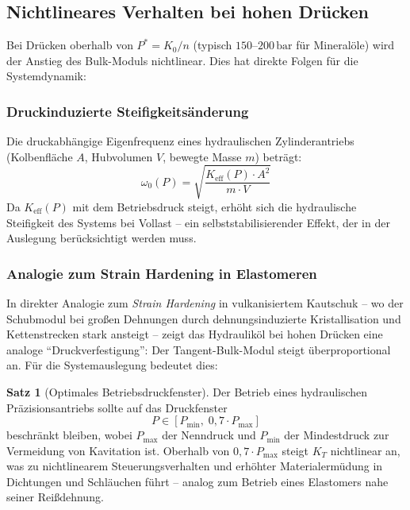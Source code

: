 ﻿\documentclass[a4paper,12pt]{scrreprt}
\theoremstyle{definition}
\newtheorem{satz}{Satz}[section]
\begin{document}
\subsection{Nichtlineares Verhalten bei hohen Drücken}

Bei Drücken oberhalb von $P^* = K_0 / n$ (typisch $150$--$200\,\mathrm{bar}$
für Mineralöle) wird der Anstieg des Bulk-Moduls nichtlinear. Dies hat
direkte Folgen für die Systemdynamik:

\subsubsection{Druckinduzierte Steifigkeitsänderung}

Die druckabhängige Eigenfrequenz eines hydraulischen Zylinderantriebs
(Kolbenfläche $A$, Hubvolumen $V$, bewegte Masse $m$) beträgt:
\begin{equation}
  \omega_0(P) = \sqrt{\frac{K_{\mathrm{eff}}(P) \cdot A^2}{m \cdot V}}
  \label{eq:eigenfrequenz}
\end{equation}
Da $K_{\mathrm{eff}}(P)$ mit dem Betriebsdruck steigt, erhöht sich die
hydraulische Steifigkeit des Systems bei Vollast -- ein selbststabilisierender
Effekt, der in der Auslegung berücksichtigt werden muss.

\subsubsection{Analogie zum Strain Hardening in Elastomeren}

In direkter Analogie zum \emph{Strain Hardening} in vulkanisiertem Kautschuk
-- wo der Schubmodul bei großen Dehnungen durch dehnungsinduzierte
Kristallisation und Kettenstrecken stark ansteigt -- zeigt das Hydrauliköl
bei hohen Drücken eine analoge ``Druckverfestigung'': Der
Tangent-Bulk-Modul steigt überproportional an. Für die Systemauslegung
bedeutet dies:

\begin{satz}[Optimales Betriebsdruckfenster]
  Der Betrieb eines hydraulischen Präzisionsantriebs sollte auf das
  Druckfenster
  \begin{equation}
    P \in [P_{\min},\; 0{,}7 \cdot P_{\max}]
  \end{equation}
  beschränkt bleiben, wobei $P_{\max}$ der Nenndruck und $P_{\min}$
  der Mindestdruck zur Vermeidung von Kavitation ist. Oberhalb von
  $0{,}7 \cdot P_{\max}$ steigt $K_T$ nichtlinear an, was zu nichtlinearem
  Steuerungsverhalten und erhöhter Materialermüdung in Dichtungen und
  Schläuchen führt -- analog zum Betrieb eines Elastomers nahe seiner
  Reißdehnung.
  \label{satz:betriebsdruckfenster}
\end{satz}
\end{document}
